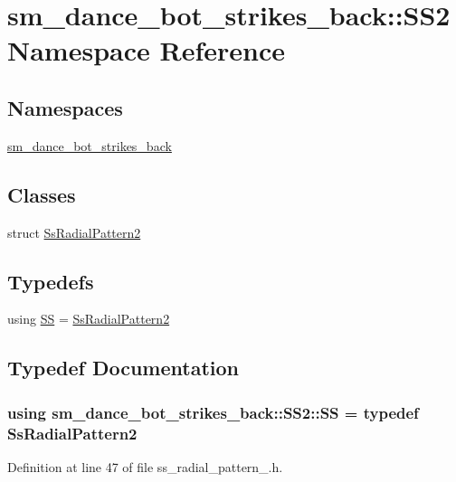 \hypertarget{namespacesm__dance__bot__strikes__back_1_1SS2}{}\section{sm\+\_\+dance\+\_\+bot\+\_\+strikes\+\_\+back\+:\+:S\+S2 Namespace Reference}
\label{namespacesm__dance__bot__strikes__back_1_1SS2}
\subsection*{Namespaces}
\begin{DoxyCompactItemize}
\item 
 \hyperlink{namespacesm__dance__bot__strikes__back_1_1SS2_1_1sm__dance__bot__strikes__back}{sm\+\_\+dance\+\_\+bot\+\_\+strikes\+\_\+back}
\end{DoxyCompactItemize}
\subsection*{Classes}
\begin{DoxyCompactItemize}
\item 
struct \hyperlink{structsm__dance__bot__strikes__back_1_1SS2_1_1SsRadialPattern2}{Ss\+Radial\+Pattern2}
\end{DoxyCompactItemize}
\subsection*{Typedefs}
\begin{DoxyCompactItemize}
\item 
using \hyperlink{namespacesm__dance__bot__strikes__back_1_1SS2_a0f9daf19a622a6005f9fe45e95593c3f}{SS} = \hyperlink{structsm__dance__bot__strikes__back_1_1SS2_1_1SsRadialPattern2}{Ss\+Radial\+Pattern2}
\end{DoxyCompactItemize}


\subsection{Typedef Documentation}
\subsubsection[{\texorpdfstring{SS}{SS}}]{\setlength{\rightskip}{0pt plus 5cm}using {\bf sm\+\_\+dance\+\_\+bot\+\_\+strikes\+\_\+back\+::\+S\+S2\+::\+SS} = typedef {\bf Ss\+Radial\+Pattern2}}\hypertarget{namespacesm__dance__bot__strikes__back_1_1SS2_a0f9daf19a622a6005f9fe45e95593c3f}{}\label{namespacesm__dance__bot__strikes__back_1_1SS2_a0f9daf19a622a6005f9fe45e95593c3f}


Definition at line 47 of file ss\+\_\+radial\+\_\+pattern\+\_.\+h.

